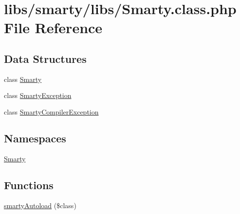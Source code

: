 \hypertarget{_smarty_8class_8php}{}\section{libs/smarty/libs/\+Smarty.class.\+php File Reference}
\label{_smarty_8class_8php}
\subsection*{Data Structures}
\begin{DoxyCompactItemize}
\item 
class \hyperlink{class_smarty}{Smarty}
\item 
class \hyperlink{class_smarty_exception}{Smarty\+Exception}
\item 
class \hyperlink{class_smarty_compiler_exception}{Smarty\+Compiler\+Exception}
\end{DoxyCompactItemize}
\subsection*{Namespaces}
\begin{DoxyCompactItemize}
\item 
 \hyperlink{namespace_smarty}{Smarty}
\end{DoxyCompactItemize}
\subsection*{Functions}
\begin{DoxyCompactItemize}
\item 
\hyperlink{_smarty_8class_8php_aaef1cef23ac934a90b948d5416d0d452}{smarty\+Autoload} (\$class)
\end{DoxyCompactItemize}
